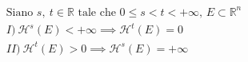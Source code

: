 \documentclass[preview]{standalone}
\begin{document}
\begin{align*}
\text{Siano } s,\ t \in  \mathbb{R} \text{ tale che } 0 \leq s < t < + \infty, \, E \subset \mathbb{R}^n \\ I) \ \mathcal{H}^s(E) < + \infty \implies \mathcal{H}^t(E) = 0 \\ II) \ \mathcal{H}^t(E) > 0 \implies \mathcal{H}^s(E) = + \infty
\end{align*}
\end{document}
